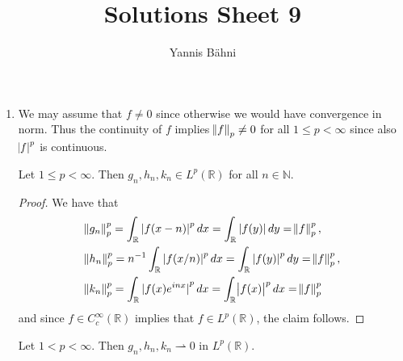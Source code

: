 

\title{Solutions Sheet 9}
\author{Yannis B\"{a}hni}
\address[Yannis B\"{a}hni]{University of Zurich, R\"{a}mistrasse 71, 8006 Zurich}



\maketitle
\thispagestyle{fancy}

\setcounter{section}{1}

\begin{enumerate}[label = \textbf{Exercise \arabic*.},wide = 0pt, itemsep = 1.5ex]
	\item We may assume that $f \neq 0$ since otherwise we would have convergence in norm. Thus the continuity of $f$ implies $\norm{f}_p \neq 0$ for all $1 \leq p < \infty$ since also $\abs{f}^p$ is continuous.
		\begin{lemma}
			Let $1 \leq p < \infty$. Then $g_n,h_n,k_n \in L^p(\mathbb{R})$ for all $n \in \mathbb{N}$.	
		\end{lemma}

		\begin{proof}
			We have that 
			\begin{align*}
				&\norm{g_n}_p^p = \int_\mathbb{R} \abs[0]{f(x - n)}^p dx = \int_\mathbb{R} \abs[0]{f(y)} dy = \norm{f}_p^p,\\
				&\norm{h_n}_p^p = n^{-1}\int_\mathbb{R} \abs[0]{f(x/n)}^p dx = \int_\mathbb{R} \abs[0]{f(y)}^p dy = \norm{f}_p^p,\\
				&\norm{k_n}_p^p = \int_\mathbb{R} \abs[0]{f(x) e^{inx}}^p dx = \int_\mathbb{R} \abs{f(x)}^p dx = \norm{f}_p^p 
			\end{align*}
			\noindent and since $f \in C_c^\infty(\mathbb{R})$ implies that $f \in L^p(\mathbb{R})$, the claim follows.
		\end{proof}

		\begin{lemma}
			Let $1 < p < \infty$. Then $g_n,h_n,k_n \rightharpoonup 0$ in $L^p(\mathbb{R})$.
		\end{lemma}


\end{enumerate}
